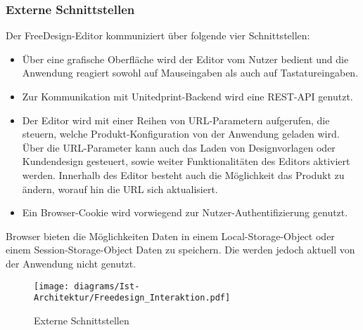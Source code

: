 \subsubsection{Externe Schnittstellen}
Der FreeDesign-Editor kommuniziert über folgende vier Schnittstellen:
\begin{itemize}
	\item Über eine grafische Oberfläche wird der Editor vom Nutzer bedient und die Anwendung reagiert sowohl auf Mauseingaben als auch auf Tastatureingaben. 
	\item Zur Kommunikation mit Unitedprint-Backend wird eine REST-API genutzt. 
	\item Der Editor wird mit einer Reihen von URL-Parametern aufgerufen, die steuern, welche Produkt-Konfiguration von der Anwendung geladen wird. Über die URL-Parameter kann auch das Laden von Designvorlagen oder Kundendesign gesteuert, sowie weiter Funktionalitäten des Editors aktiviert werden. 
	Innerhalb des Editor besteht auch die Möglichkeit das Produkt zu ändern, worauf hin die URL sich aktualisiert.
	\item Ein Browser-Cookie wird vorwiegend zur Nutzer-Authentifizierung genutzt. 
\end{itemize}

Browser bieten die Möglichkeiten Daten in einem Local-Storage-Object oder einem Session-Storage-Object Daten zu speichern. \autocite[vgl.][]{Mozilla:Storage}
Die werden jedoch aktuell von der Anwendung nicht genutzt. 


\begin{figure}[H]
    \centering
    \texttt{[image: diagrams/Ist-Architektur/Freedesign\_Interaktion.pdf]}
     \caption{Externe Schnittstellen}
     \label{fig:Externe_Schnittstellen}
  \end{figure}
  